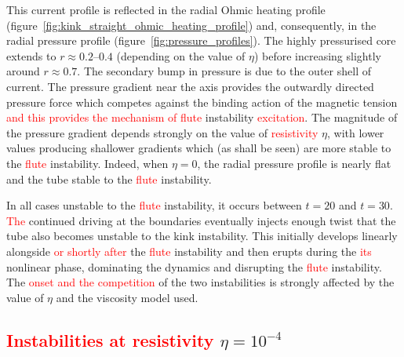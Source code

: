 \documentclass[12pt]{article}
\newcommand{\rs}[2]{\textcolor{red}{#2}}
\begin{document}
This current profile is reflected in the radial Ohmic heating profile
(figure~\ref{fig:kink_straight_ohmic_heating_profile}) and,
consequently, in the radial pressure profile
(figure~\ref{fig:pressure_profiles}). The highly pressurised core
extends to $r\approx 0.2$--$0.4$ (depending on the value of $\eta$)
before increasing slightly around $r\approx 0.7$. The secondary bump
in pressure is due to the outer shell of current. The pressure
gradient near the axis provides the outwardly directed pressure force
which competes against the binding action of the magnetic tension
\rs{to (potentially) result in the}{and this provides the mechanism of}
\rs{fluting}{flute} instability \rs{}{excitation}.  The magnitude
of the pressure gradient depends strongly on the value of
\rs{}{resistivity} $\eta$, with lower values producing shallower 
gradients which (as shall be seen) are more stable to the
\rs{fluting}{flute} instability. Indeed, when $\eta=0$, the radial
pressure profile is nearly flat and the tube stable to the
\rs{fluting}{flute} instability.

In all cases unstable to the \rs{fluting}{flute} instability, it
occurs \rs{some time}{} between $t=20$ and $t=30$. \rs{During this
  time, the}{The} continued driving at the boundaries eventually
injects enough twist that the tube also becomes unstable to the kink
instability. This initially develops linearly alongside \rs{}{or shortly
after} the \rs{fluting}{flute} instability and then erupts during the
\rs{kink's}{its}  nonlinear phase, dominating the dynamics and
disrupting the   \rs{fluting}{flute} instability. The \rs{}{onset and
the competition} of the two instabilities is strongly affected by
the value of $\eta$ and the viscosity model used. 

\subsection{\rs{Development where}{Instabilities at resistivity} $\eta=10^{-4}$}
\end{document}
